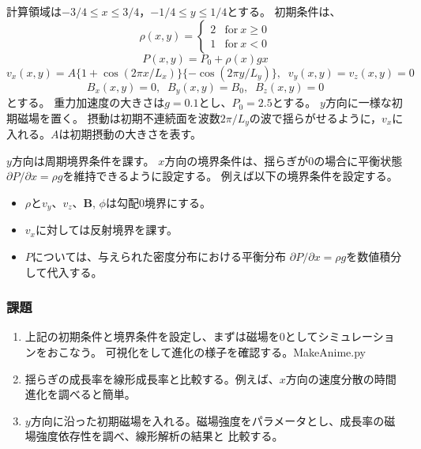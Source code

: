 計算領域は$-3/4\le x\le 3/4$，$-1/4\le y\le 1/4$とする。
初期条件は、
\begin{equation}
\rho(x,y) = \left\{
\begin{array}{cl}
2 & \mathrm{for}~x\ge 0 \\
1 & \mathrm{for}~x<0
\end{array}
\right.
\end{equation}
\begin{equation}
P(x,y) = P_0 + \rho(x) g x
\end{equation}
\begin{equation}
v_x(x,y) = A \{1+\cos(2\pi x/L_x) \}\{-\cos(2\pi y/L_y)\} ,\;\;v_y(x,y) = v_z(x,y) = 0
\end{equation}
\begin{equation}
    B_x(x,y) = 0,\;\;B_y(x,y) = B_0,\;\;B_z(x,y)=0
\end{equation}
とする。
重力加速度の大きさは$g=0.1$とし、$P_0=2.5$とする。
$y$方向に一様な初期磁場を置く。
摂動は初期不連続面を波数$2\pi/L_y$の波で揺らがせるように，$v_x$に入れる。$A$は初期摂動の大きさを表す。


$y$方向は周期境界条件を課す。
$x$方向の境界条件は、揺らぎが0の場合に平衡状態$\partial P/\partial x=\rho g$を維持できるように設定する。
例えば以下の境界条件を設定する。
\begin{itemize}
    \item  $\rho$と$v_y$、$v_z$、$\bm{B}$, $\phi$は勾配0境界にする。
    \item  $v_x$に対しては反射境界を課す。
    \item  $P$については、与えられた密度分布における平衡分布
    $\partial P/\partial x=\rho g$を数値積分して代入する。
\end{itemize}


\newpage
\subsubsection{課題}
\begin{enumerate}
\item 上記の初期条件と境界条件を設定し、まずは磁場を0としてシミュレーションをおこなう。
可視化をして進化の様子を確認する。{\ttfamily MakeAnime.py}

\item 揺らぎの成長率を線形成長率と比較する。例えば、$x$方向の速度分散の時間進化を調べると簡単。

\item $y$方向に沿った初期磁場を入れる。磁場強度をパラメータとし、成長率の磁場強度依存性を調べ、線形解析の結果と
比較する。
    
\end{enumerate}

